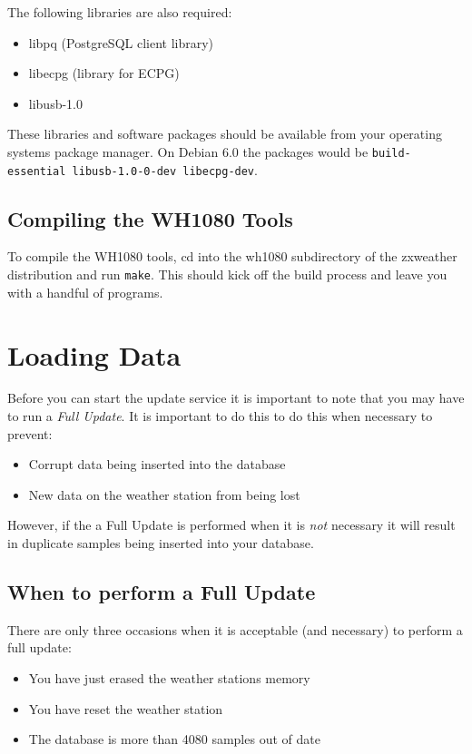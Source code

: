 \documentclass[a4paper,10pt,draft]{book}
\begin{document}
The following libraries are also required:
\begin{itemize}
\item libpq (PostgreSQL client library)
\item libecpg (library for ECPG)
\item libusb-1.0
\end{itemize}

These libraries and software packages should be available from your operating systems package manager. On Debian 6.0 the packages would be \verb|build-essential libusb-1.0-0-dev libecpg-dev|.

\subsection{Compiling the WH1080 Tools}


To compile the WH1080 tools, cd into the wh1080 subdirectory of the zxweather distribution and run \verb|make|. This should kick off the build process and leave you with a handful of programs.


\section{Loading Data}

Before you can start the update service it is important to note that you may have to run a \emph{Full Update}. It is important to do this to do this when necessary to prevent:
\begin{itemize}
\item Corrupt data being inserted into the database
\item New data on the weather station from being lost
\end{itemize}

However, if the a Full Update is performed when it is \emph{not} necessary it will result in duplicate samples being inserted into your database.

\subsection{When to perform a Full Update}
There are only three occasions when it is acceptable (and necessary) to perform a full update:
\begin{itemize}
\item You have just erased the weather stations memory
\item You have reset the weather station
\item The database is more than 4080 samples out of date
\end{itemize}
\end{document}
